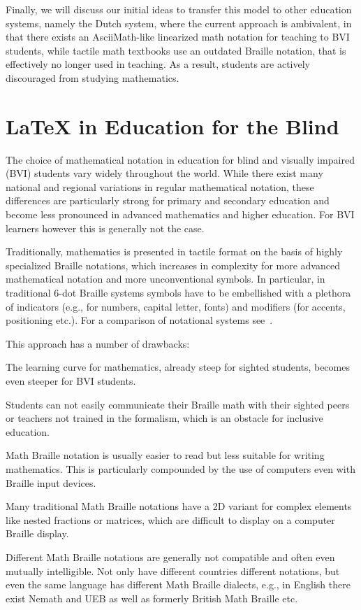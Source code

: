 \documentclass{easychair}
\begin{document}
Finally, we will discuss our initial ideas to transfer this model to other
education systems, namely the Dutch system, where the current approach is
ambivalent, in that there exists an AsciiMath-like linearized math notation for
teaching to BVI students, while tactile math textbooks use an outdated Braille
notation, that is effectively no longer used in teaching.  As a result, students
are actively discouraged from studying mathematics.

\section{{\LaTeX} in Education for the Blind}\label{sec:latex-in-schools}

The choice of mathematical notation in education for blind and visually impaired
(BVI) students vary widely throughout the world. While there exist many national
and regional variations in regular mathematical notation, these differences are
particularly strong for primary and secondary education and become less
pronounced in advanced mathematics and higher education. For BVI learners
however this is generally not the case.

Traditionally, mathematics is presented in tactile format on the basis of highly
specialized Braille notations, which increases in complexity for more advanced
mathematical notation and more unconventional symbols. In particular, in
traditional 6-dot Braille systems symbols have to be embellished with a plethora
of indicators (e.g., for numbers, capital letter, fonts) and modifiers (for
accents, positioning etc.). For a comparison of notational systems
see~\cite{van2022towards}.

This approach has a number of drawbacks: 
\begin{inparaenum}[(1)]
\item The learning curve for mathematics, already steep for sighted students,
  becomes even steeper for BVI students.
\item Students can not easily communicate their Braille math with their sighted
  peers or teachers not trained in the formalism, which is an obstacle for
  inclusive education.
\item Math Braille notation is usually easier to read but less suitable for
  writing mathematics. This is particularly compounded by the use of computers
  even with Braille input devices.
\item Many traditional Math Braille notations have a 2D variant for complex
  elements like nested fractions or matrices, which are difficult to display on
  a computer Braille display.
\item Different Math Braille notations are generally not compatible and often
  even mutually intelligible. Not only have different countries different
  notations, but even the same language has different Math Braille dialects,
  e.g., in English there exist Nemath and UEB as well as formerly British Math
  Braille etc.
\end{inparaenum}
\end{document}
